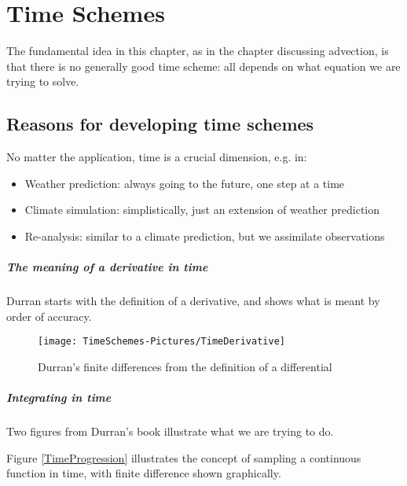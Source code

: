 \chapter{Time Schemes}

The fundamental idea in this chapter, as in the chapter discussing advection, is that there is no generally good time scheme: all depends on what equation we are trying to solve.

\section{Reasons for developing time schemes}

No matter the application, time is a crucial dimension, e.g. in:
\begin{itemize}
	\item Weather prediction: always going to the future, one step at a time
	\item Climate simulation: simplistically, just an extension of weather prediction
	\item Re-analysis: similar to a climate prediction, but we assimilate observations
\end{itemize}

\paragraph{The meaning of a derivative in time}

Durran starts with the definition of a derivative, and shows what is meant by order of accuracy.

\begin{figure}[h!]
	\texttt{[image: TimeSchemes-Pictures/TimeDerivative]}
	\caption{Durran's finite differences from the definition of a differential}
	\label{TimeDerivative}
\end{figure}

\paragraph{Integrating in time}
Two figures from Durran's book illustrate what we are trying to do.

Figure \ref{TimeProgression} illustrates the concept of sampling a continuous function in time, with finite difference shown graphically.

